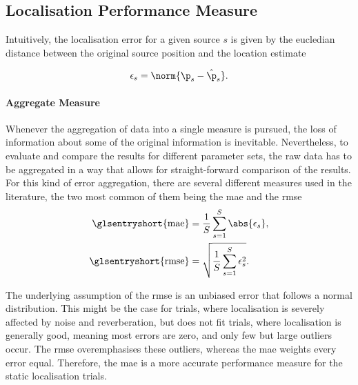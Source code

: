 \subsection{Localisation Performance Measure}
\label{sec:performanceMeasure}

Intuitively, the localisation error for a given source $s$ is given by the eucledian distance between the original source position and the location estimate

\begin{equation}
	\epsilon_s = \norm{\p_s-\hat\p_s}.
	\label{eq:error}
\end{equation}

\paragraph{Aggregate Measure} Whenever the aggregation of data into a single measure is pursued, the loss of information about some of the original information is inevitable. Nevertheless, to evaluate and compare the results for different parameter sets, the raw data has to be aggregated in a way that allows for straight-forward comparison of the results. For this kind of error aggregation, there are several different measures used in the literature, the two most common of them being the \gls{mae} and the \gls{rmse}
\begin{align}
	\text{\glsentryshort{mae}}  & =\frac{1}{S}\sum_{s=1}^{S}\abs{\epsilon_s},    \\
	\text{\glsentryshort{rmse}} & =\sqrt{\frac{1}{S}\sum_{s=1}^{S}\epsilon_s^2}.
	\label{eq:mae}
\end{align}

The underlying assumption of the \gls{rmse} is an unbiased error that follows a normal distribution. This might be the case for trials, where localisation is severely affected by noise and reverberation, but does not fit trials, where localisation is generally good, meaning most errors are zero, and only few but large outliers occur. The \gls{rmse} overemphasises these outliers, whereas the \gls{mae} weights every error equal. Therefore, the \gls{mae} is a more accurate performance measure for the static localisation trials.

